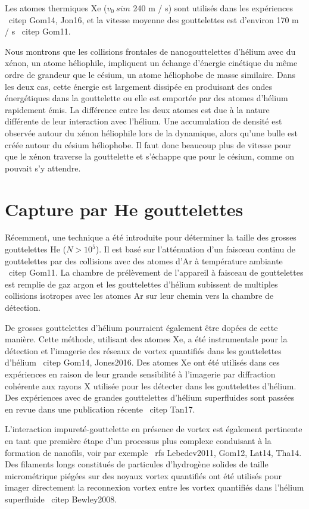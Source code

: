 		Les atomes thermiques Xe ($ v_0 \ sim $ 240 m / s) sont utilisés dans les expériences \ citep {Gom14, Jon16}, et la vitesse moyenne des gouttelettes est d'environ 170 m / s \ citep {Gom11}.
		
		Nous montrons que les collisions frontales de nanogouttelettes d'hélium avec du xénon, un atome héliophile, impliquent un échange d'énergie cinétique du même ordre de grandeur que le césium, un atome héliophobe de masse similaire. Dans les deux cas, cette énergie est largement dissipée en produisant des ondes énergétiques dans la gouttelette ou elle est emportée par des atomes d'hélium rapidement émis. La différence entre les deux atomes est due à la nature différente de leur interaction avec l'hélium. Une accumulation de densité est observée autour du xénon héliophile lors de la dynamique, alors qu'une bulle est créée autour du césium héliophobe. Il faut donc beaucoup plus de vitesse pour que le xénon traverse la gouttelette et s'échappe que pour le césium, comme on pouvait s'y attendre.
	
	\section*{Capture par He gouttelettes}
		Récemment, une technique a été introduite pour déterminer la taille des grosses gouttelettes He ($ N> 10 ^ 5 $). Il est basé sur l'atténuation d'un faisceau continu de gouttelettes par des collisions avec des atomes d'Ar à température ambiante \ citep {Gom11}. La chambre de prélèvement de l'appareil à faisceau de gouttelettes est remplie de gaz argon et les gouttelettes d'hélium subissent de multiples collisions isotropes avec les atomes Ar sur leur chemin vers la chambre de détection.
		
		De grosses gouttelettes d'hélium pourraient également être dopées de cette manière. Cette méthode, utilisant des atomes Xe, a été instrumentale pour la détection et l'imagerie des réseaux de vortex quantifiés dans les gouttelettes d'hélium \ citep {Gom14, Jones2016}. Des atomes Xe ont été utilisés dans ces expériences en raison de leur grande sensibilité à l'imagerie par diffraction cohérente aux rayons X utilisée pour les détecter dans les gouttelettes d'hélium. Des expériences avec de grandes gouttelettes d'hélium superfluides sont passées en revue dans une publication récente \ citep {Tan17}.
		
		L'interaction impureté-gouttelette en présence de vortex est également pertinente en tant que première étape d'un processus plus complexe conduisant à la formation de nanofils, voir par exemple \ rfs {Lebedev2011, Gom12, Lat14, Tha14}. Des filaments longs constitués de particules d'hydrogène solides de taille micrométrique piégées sur des noyaux vortex quantifiés ont été utilisés pour imager directement la reconnexion vortex entre les vortex quantifiés dans l'hélium superfluide \ citep {Bewley2008}.
		
